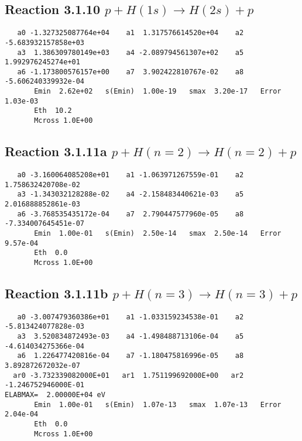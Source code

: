 \documentclass[12pt,dvipdfmx]{article}
\begin{document}
\newpage
\subsection{
Reaction 3.1.10 $   p + H(1s) \rightarrow H(2s) + p$}


\begin{small}\begin{verbatim}
   a0 -1.327325087764e+04    a1  1.317576614520e+04    a2 -5.683932157858e+03
   a3  1.386309780149e+03    a4 -2.089794561307e+02    a5  1.992976245274e+01
   a6 -1.173800576157e+00    a7  3.902422810767e-02    a8 -5.606240339932e-04
       Emin  2.62e+02   s(Emin)  1.00e-19   smax  3.20e-17   Error  1.03e-03
       Eth  10.2
       Mcross 1.0E+00
\end{verbatim}\end{small}


\newpage
\subsection{
Reaction 3.1.11a $   p + H(n=2) \rightarrow H(n=2) + p$}


\begin{small}\begin{verbatim}
   a0 -3.160064085208e+01    a1 -1.063971267559e-01    a2  1.758632420708e-02
   a3 -1.343032128288e-02    a4 -2.158483440621e-03    a5  2.016888852861e-03
   a6 -3.768535435172e-04    a7  2.790447577960e-05    a8 -7.334007645451e-07
       Emin  1.00e-01   s(Emin)  2.50e-14   smax  2.50e-14   Error  9.57e-04
       Eth  0.0
       Mcross 1.0E+00
\end{verbatim}\end{small}


\newpage
\subsection{
Reaction 3.1.11b $p + H(n=3) \rightarrow H(n=3) + p$}















\begin{small}\begin{verbatim}
   a0 -3.007479360386e+01    a1 -1.033159234538e-01    a2 -5.813424077828e-03
   a3  3.520834872493e-03    a4 -1.498488713106e-04    a5 -4.614034275366e-04
   a6  1.226477420816e-04    a7 -1.180475816996e-05    a8  3.892872672032e-07
  ar0 -3.732339082000E+01   ar1  1.751199692000E+00   ar2 -1.246752946000E-01
ELABMAX=  2.00000E+04 eV
       Emin  1.00e-01   s(Emin)  1.07e-13   smax  1.07e-13   Error  2.04e-04
       Eth  0.0
       Mcross 1.0E+00
\end{verbatim}\end{small}
\end{document}
